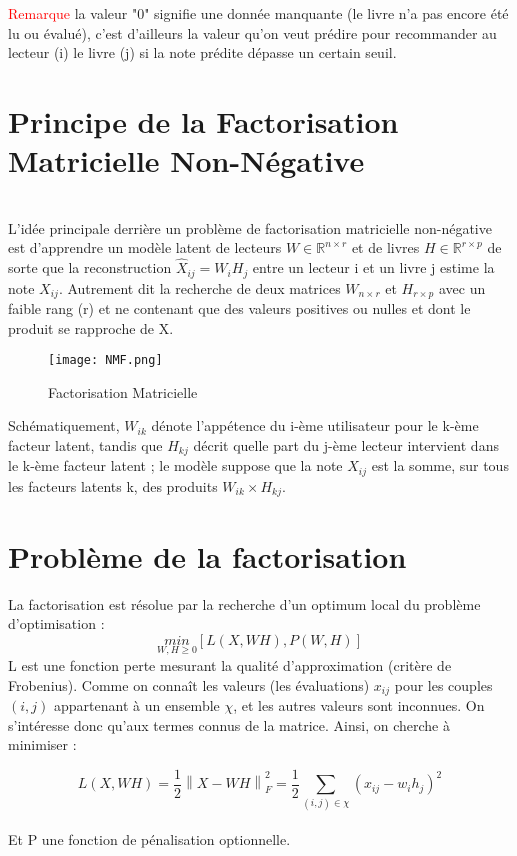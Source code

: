 \documentclass[12pt,letterpaper,twocolumn]{article}
\begin{document}
\textcolor{red}{Remarque} la valeur "0" signifie une donnée manquante (le livre n'a pas encore été lu ou évalué), c'est d'ailleurs la valeur qu'on veut prédire pour recommander au lecteur (i) le livre (j) si la note prédite dépasse un certain seuil. 



\section{Principe de la Factorisation Matricielle Non-Négative}
\justify \\

L’idée principale derrière un problème de factorisation matricielle non-négative est d’apprendre un modèle latent de lecteurs $W\in \mathbb{R}^{n\times r}$ et de livres $H\in \mathbb{R}^{r\times p}$ de sorte que la reconstruction $\widehat{X}_{ij}=W_iH_j$ entre un lecteur i et un livre j estime la note $X_{ij}$. Autrement dit la recherche de deux matrices $W_{n\times r}$ et $H_{r\times p}$ avec un faible rang (r) et ne contenant que des valeurs positives ou nulles et dont le produit se rapproche de X.

\begin{figure}[!h]
\centering
\texttt{[image: NMF.png]}
\caption{Factorisation Matricielle}
\end{figure}

Schématiquement, $W_{ik}$ dénote l’appétence du i-ème utilisateur pour le k-ème facteur latent, tandis que $H_{kj}$ décrit quelle part du j-ème lecteur intervient
dans le k-ème facteur latent ; le modèle suppose que la note $X_{ij}$ est la somme,
sur tous les facteurs latents k, des produits $W_{ik}\times H_{kj}$. \\ 

\section{Problème de la factorisation}
\justify  

La factorisation est résolue par la recherche d’un optimum local du problème d’optimisation :
$$ \underset{W,H\geq 0}{min}[L(X, WH), P(W,H)] $$
L est une fonction perte mesurant la qualité d’approximation (critère de Frobenius).
Comme on connaît les valeurs (les évaluations) $x_{ij}$ pour les couples $(i, j)$ appartenant à un ensemble $\chi$, et les autres valeurs sont inconnues. On s’intéresse donc qu’aux termes connus de la matrice. Ainsi, on cherche à minimiser :

$$ L(X,WH)= \frac{1}{2} \left \| X-WH \right \|^2_F = \frac{1}{2} \sum_{(i,j)\in \chi}^{}(x_{ij}-w_ih_j)^2 $$  \\
Et P une fonction de pénalisation optionnelle.
\end{document}
